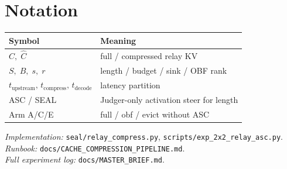\documentclass[11pt]{article}
\begin{document}
\section{Notation}

\begin{center}
\begin{tabular}{@{}ll@{}}
\toprule
Symbol & Meaning \\
\midrule
$C,\;\widehat C$ & full / compressed relay KV \\
$S,\;B,\;s,\;r$ & length / budget / sink / OBF rank \\
$t_{\mathrm{upstream}},\,t_{\mathrm{compress}},\,t_{\mathrm{decode}}$
  & latency partition \\
ASC / SEAL & Judger-only activation steer for length \\
Arm A/C/E & full / obf / evict without ASC \\
\bottomrule
\end{tabular}
\end{center}

\vspace{1em}
\noindent\textit{Implementation:} \texttt{seal/relay\_compress.py},
\texttt{scripts/exp\_2x2\_relay\_asc.py}.\\
\noindent\textit{Runbook:} \texttt{docs/CACHE\_COMPRESSION\_PIPELINE.md}.\\
\noindent\textit{Full experiment log:} \texttt{docs/MASTER\_BRIEF.md}.
\end{document}
